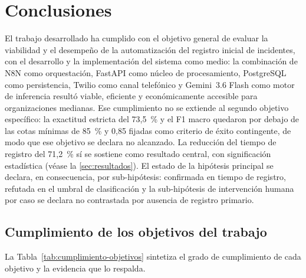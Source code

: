 \section{Conclusiones}\label{sec:conclusiones}

El trabajo desarrollado ha cumplido con el objetivo general de evaluar la viabilidad y el desempeño de la automatización del registro inicial de incidentes, con el desarrollo y la implementación del sistema como medio: la combinación de N8N como orquestación, FastAPI como núcleo de procesamiento, PostgreSQL como persistencia, Twilio como canal telefónico y Gemini~3.6 Flash como motor de inferencia resultó viable, eficiente y económicamente accesible para organizaciones medianas. Ese cumplimiento no se extiende al segundo objetivo específico: la exactitud estricta del 73,5~\% y el F1 macro quedaron por debajo de las cotas mínimas de 85~\% y 0,85 fijadas como criterio de éxito contingente, de modo que ese objetivo se declara no alcanzado. La reducción del tiempo de registro del 71,2~\% sí se sostiene como resultado central, con significación estadística (véase la \autoref{sec:resultados}). El estado de la hipótesis principal se declara, en consecuencia, por sub-hipótesis: confirmada en tiempo de registro, refutada en el umbral de clasificación y la sub-hipótesis de intervención humana por caso se declara no contrastada por ausencia de registro primario.

\subsection{Cumplimiento de los objetivos del trabajo}\label{subsec:cumplimiento-objetivos}

La Tabla~\ref{tab:cumplimiento-objetivos} sintetiza el grado de cumplimiento de cada objetivo y la evidencia que lo respalda.

